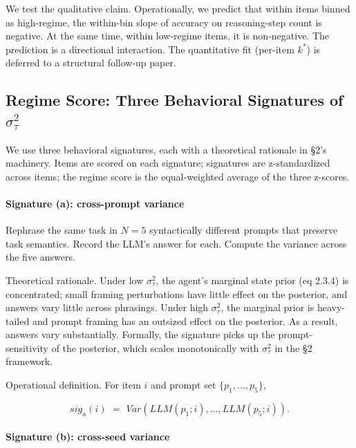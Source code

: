 \documentclass{article}
\begin{document}
We test the qualitative claim. Operationally, we predict that within
items binned as high-regime, the within-bin slope of accuracy on
reasoning-step count is negative. At the same time, within low-regime
items, it is non-negative. The prediction is a directional interaction.
The quantitative fit (per-item \(k^{*}\)) is deferred to a structural
follow-up paper.

\subsection{\texorpdfstring{Regime Score: Three Behavioral
Signatures of
\(\sigma_{\tau}^{2}\)}{\S{}3.2 Regime Score: Three Behavioral Signatures of \textbackslash sigma\_\{\textbackslash tau\}\^{}\{2\}}}\label{regime-score-three-behavioral-signatures-of-sigma_tau2}

We use three behavioral signatures, each with a theoretical rationale in
\S{}2's machinery. Items are scored on each signature; signatures are
z-standardized across items; the regime score is the equal-weighted
average of the three z-scores.

\paragraph{Signature (a): cross-prompt
variance}\label{signature-a-cross-prompt-variance}

Rephrase the same task in \(N = 5\) syntactically different prompts that
preserve task semantics. Record the LLM's answer for each. Compute the
variance across the five answers.

Theoretical rationale. Under low \(\sigma_{\tau}^{2}\), the agent's
marginal state prior (eq 2.3.4) is concentrated; small framing
perturbations have little effect on the posterior, and answers vary
little across phrasings. Under high \(\sigma_{\tau}^{2}\), the marginal
prior is heavy-tailed and prompt framing has an outsized effect on the
posterior. As a result, answers vary substantially. Formally, the
signature picks up the prompt-sensitivity of the posterior, which scales
monotonically with \(\sigma_{\tau}^{2}\) in the \S{}2 framework.

Operational definition. For item \(i\) and prompt set
\(\{ p_{1},\ldots,p_{5}\}\),

\[{sig}_{a}(i)\mspace{6mu} = \mspace{6mu} Var\left( LLM(p_{1};i),\ldots,LLM(p_{5};i) \right).\]

\paragraph{Signature (b): cross-seed
variance}\label{signature-b-cross-seed-variance}
\end{document}
